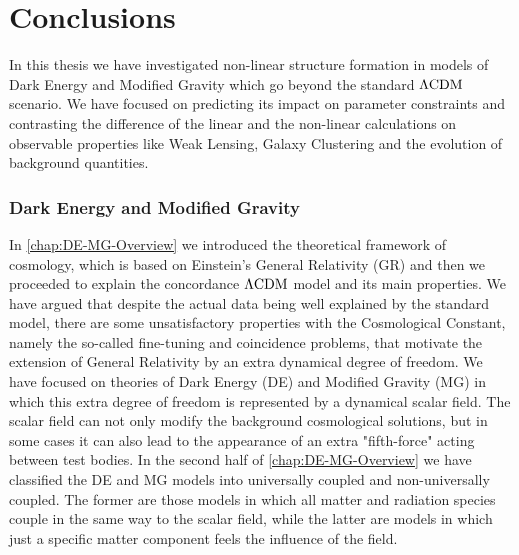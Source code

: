 \chapter*{Conclusions \label{Conclu}} %






\done{}
In this thesis we have investigated non-linear structure formation in models of Dark Energy and Modified 
Gravity which go beyond the standard $\Lambda\mathrm{CDM}$ scenario. We have focused on predicting its impact
on parameter constraints and contrasting the difference of the linear and the non-linear calculations on observable properties like Weak Lensing, 
Galaxy Clustering and the evolution of background quantities.

\subsection*{Dark Energy and Modified Gravity}

In \cref{chap:DE-MG-Overview} we introduced the theoretical framework of cosmology, which is
based on Einstein's General Relativity (GR) and then we proceeded to explain the concordance $\Lambda\mathrm{CDM}$
model and its main properties. 
We have argued that despite the actual data being well explained by the standard model, 
there are some unsatisfactory properties with the Cosmological Constant, namely the so-called fine-tuning
and coincidence problems, that motivate the extension of General Relativity by an extra dynamical degree of freedom.
We have focused on theories of Dark Energy (DE) and Modified Gravity (MG) in which this extra degree of freedom  is represented by a dynamical scalar field. The scalar field can not 
only modify the background cosmological solutions,
but in some cases it can also lead to the appearance of an extra "fifth-force" acting between test bodies.
In the second half of \cref{chap:DE-MG-Overview} we have classified the DE and MG models into universally coupled  and non-universally coupled. The former are those models in which all matter and radiation species couple
in the same way to the scalar field, while the latter are models in which just a specific matter component feels the influence of the field. 

